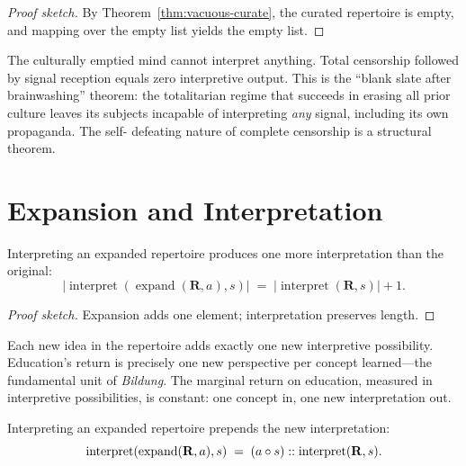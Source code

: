 \begin{proof}[Proof sketch]
By Theorem~\ref{thm:vacuous-curate}, the curated repertoire is empty,
and mapping over the empty list yields the empty list.
\end{proof}

The culturally emptied mind cannot interpret anything.  Total censorship
followed by signal reception equals zero interpretive output.  This is the
``blank slate after brainwashing'' theorem: the totalitarian regime that
succeeds in erasing all prior culture leaves its subjects incapable of
interpreting \emph{any} signal, including its own propaganda.  The self-
defeating nature of complete censorship is a structural theorem.

\section{Expansion and Interpretation}
\label{sec:ch15-expand-interp}

\begin{theorem}
\label{thm:expanded-interp}
Interpreting an expanded repertoire produces one more interpretation than
the original:
\[
  |\operatorname{interpret}(\operatorname{expand}(\mathbf{R}, a), s)|
  \;=\;
  |\operatorname{interpret}(\mathbf{R}, s)| + 1.
\]
\end{theorem}

\begin{proof}[Proof sketch]
Expansion adds one element; interpretation preserves length.
\end{proof}

Each new idea in the repertoire adds exactly one new interpretive
possibility.  Education's return is precisely one new perspective per concept
learned---the fundamental unit of \emph{Bildung}.  The marginal return on
education, measured in interpretive possibilities, is constant: one concept
in, one new interpretation out.

\begin{theorem}
\label{thm:expand-structure}
Interpreting an expanded repertoire prepends the new interpretation:
\[
  \operatorname{interpret}(\operatorname{expand}(\mathbf{R}, a), s)
  \;=\;
  (a \circ s) :: \operatorname{interpret}(\mathbf{R}, s).
\]
\end{theorem}

